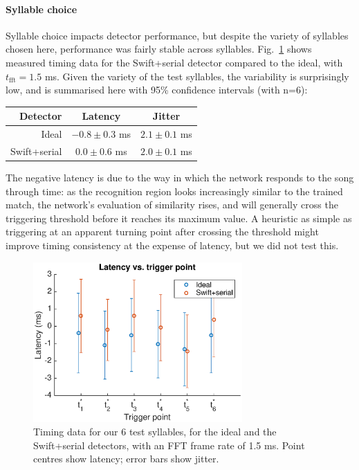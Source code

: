\documentclass[10pt,letterpaper]{article}
\newcommand\fig[1]{Fig.~\ref{#1}}
\renewcommand{\subsubsection}[1]{\paragraph{#1}}
\begin{document}
\subsubsection{Syllable choice}

Syllable choice impacts detector performance, but despite the variety
of syllables chosen here, performance was fairly stable across
syllables.  \fig{fig:TimingVsSyllable} shows measured timing data for
the Swift+serial detector compared to the ideal, with
$t_{\textrm{fft}}=1.5$ ms.  Given the variety of the test syllables,
the variability is surprisingly low, and is summarised here with 95\%
confidence intervals (with n=6):
\vspace{8pt}\par\noindent
\begin{tabular}{r|cc}
  Detector & Latency & Jitter \\ 
  \hline   Ideal & $-0.8\pm 0.3$ ms & $2.1\pm 0.1$ ms \\
  Swift+serial & $0.0\pm 0.6$ ms & $2.0\pm 0.1$ ms
\end{tabular}
\vspace{8pt}\par\noindent
The negative latency is due to the way in which the network responds
to the song through time: as the recognition region looks increasingly
similar to the trained match, the network's evaluation of similarity
rises, and will generally cross the triggering threshold before it
reaches its maximum value.  A heuristic as simple as triggering at an
apparent turning point after crossing the threshold might improve
timing consistency at the expense of latency, but we did not test this.

\begin{figure}
  \begin{center}
    \includegraphics[width=8cm]{Fig5}
  \end{center}
  \caption{Timing data for our 6 test syllables, for the ideal and the
    Swift+serial detectors, with an FFT frame rate of 1.5 ms.  Point
    centres show latency; error bars show jitter.}
  \label{fig:TimingVsSyllable}
\end{figure}
\end{document}
